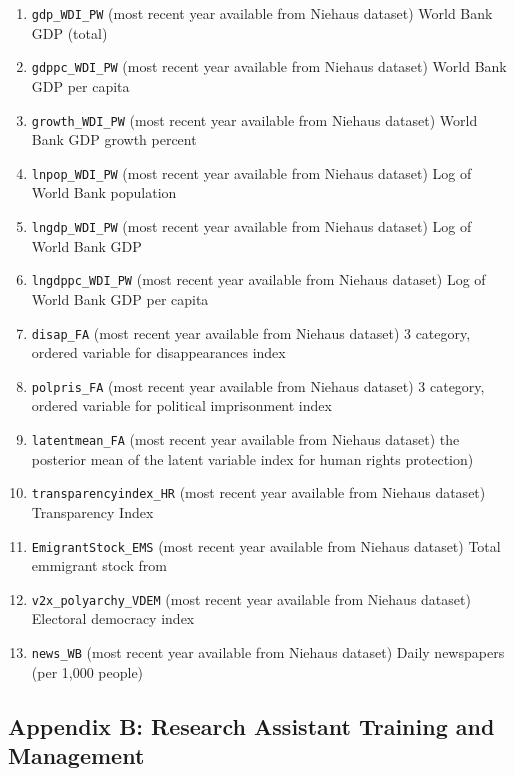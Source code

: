 \documentclass[
]{article}
\begin{document}
\begin{enumerate}
\item
  \texttt{gdp\_WDI\_PW} (most recent year available from Niehaus dataset) World Bank GDP (total)
\item
  \texttt{gdppc\_WDI\_PW} (most recent year available from Niehaus dataset) World Bank GDP per capita
\item
  \texttt{growth\_WDI\_PW} (most recent year available from Niehaus dataset) World Bank GDP growth percent
\item
  \texttt{lnpop\_WDI\_PW} (most recent year available from Niehaus dataset) Log of World Bank population
\item
  \texttt{lngdp\_WDI\_PW} (most recent year available from Niehaus dataset) Log of World Bank GDP
\item
  \texttt{lngdppc\_WDI\_PW} (most recent year available from Niehaus dataset) Log of World Bank GDP per capita
\item
  \texttt{disap\_FA} (most recent year available from Niehaus dataset) 3 category, ordered variable for disappearances index
\item
  \texttt{polpris\_FA} (most recent year available from Niehaus dataset) 3 category, ordered variable for political imprisonment index
\item
  \texttt{latentmean\_FA} (most recent year available from Niehaus dataset) the posterior mean of the latent variable index for human rights protection)
\item
  \texttt{transparencyindex\_HR} (most recent year available from Niehaus dataset) Transparency Index
\item
  \texttt{EmigrantStock\_EMS} (most recent year available from Niehaus dataset) Total emmigrant stock from
\item
  \texttt{v2x\_polyarchy\_VDEM} (most recent year available from Niehaus dataset) Electoral democracy index
\item
  \texttt{news\_WB} (most recent year available from Niehaus dataset) Daily newspapers (per 1,000 people)
\end{enumerate}

\hypertarget{appendix-b-research-assistant-training-and-management}{%
\subsection*{Appendix B: Research Assistant Training and Management}\label{appendix-b-research-assistant-training-and-management}}
\end{document}
